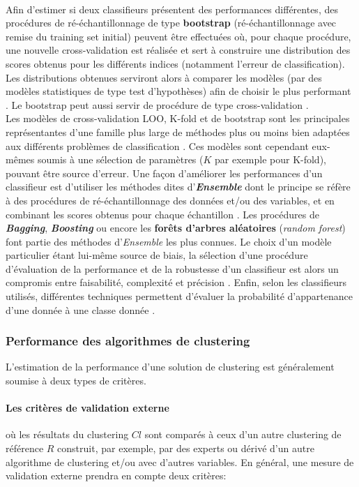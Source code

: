 \\
Afin d'estimer si deux classifieurs présentent des performances différentes, des procédures de ré-échantillonnage de type \textbf{bootstrap} (ré-échantillonnage avec remise du training set initial) peuvent être effectuées où, pour chaque procédure, une nouvelle cross-validation est réalisée et sert à construire une distribution des scores obtenus pour les différents indices (notamment l'erreur de classification). Les distributions obtenues serviront alors à comparer les modèles (par des modèles statistiques de type test d'hypothèses) afin de choisir le plus performant \citep{hamel2011knowledge,han2012data}. Le bootstrap peut aussi servir de procédure de type cross-validation \citep{han2012data}.
\\
Les modèles de cross-validation LOO, K-fold et de bootstrap sont les principales représentantes d'une famille plus large de méthodes plus ou moins bien adaptées aux différents problèmes de classification \citep{arlot2010survey}. Ces modèles sont cependant eux-mêmes soumis à une sélection de paramètres ($K$ par exemple pour K-fold), pouvant être source d'erreur. Une façon d'améliorer les performances d'un classifieur est d'utiliser les méthodes dites d'\textit{\textbf{Ensemble}} dont le principe se réfère à des procédures de ré-échantillonnage des données et/ou des variables, et en combinant les scores obtenus pour chaque échantillon \citep{han2012data}. Les procédures de \textit{\textbf{Bagging}}, \textit{\textbf{Boosting}} ou encore les \textbf{forêts d'arbres aléatoires} (\textit{random forest}) font partie des méthodes d'\textit{Ensemble} les plus connues. Le choix d'un modèle particulier étant lui-même source de biais, la sélection d'une procédure d'évaluation de la performance et de la robustesse d'un classifieur est alors un compromis entre faisabilité, complexité et précision \citep{arlot2010survey}. Enfin, selon les classifieurs utilisés, différentes techniques permettent d'évaluer la probabilité d'appartenance d'une donnée à une classe donnée \citep{ruping2004simple,wu2004probability}. 

\subsubsection{Performance des algorithmes de clustering}\label{parclustperf}
L'estimation de la performance d'une solution de clustering est généralement soumise à deux types de critères.
\paragraph{Les critères de validation externe} \citep{han2012data,gan2007data} où les résultats du clustering $Cl$ sont comparés à ceux d'un autre clustering de référence $R$ construit, par exemple, par des experts ou dérivé d'un autre algorithme de clustering et/ou avec d'autres variables. En général, une mesure de validation externe prendra en compte deux critères:

